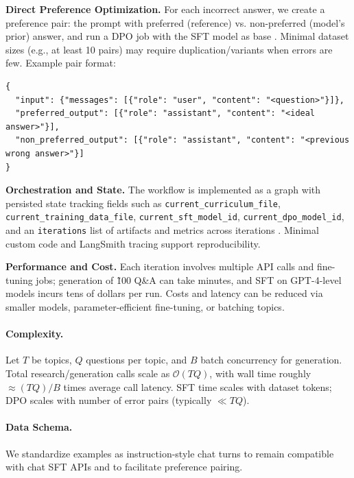 \documentclass[11pt]{article}
\begin{document}
\textbf{Direct Preference Optimization.} For each incorrect answer, we create a preference pair: the prompt with preferred (reference) vs. non-preferred (model’s prior) answer, and run a DPO job with the SFT model as base \citep{rafailov2023dpo}. Minimal dataset sizes (e.g., at least 10 pairs) may require duplication/variants when errors are few. Example pair format:
\begin{verbatim}
{
  "input": {"messages": [{"role": "user", "content": "<question>"}]},
  "preferred_output": [{"role": "assistant", "content": "<ideal answer>"}],
  "non_preferred_output": [{"role": "assistant", "content": "<previous wrong answer>"}]
}
\end{verbatim}

\textbf{Orchestration and State.} The workflow is implemented as a graph with persisted state tracking fields such as \texttt{current\_curriculum\_file}, \texttt{current\_training\_data\_file}, \texttt{current\_sft\_model\_id}, \texttt{current\_dpo\_model\_id}, and an \texttt{iterations} list of artifacts and metrics across iterations \citep{langgraph_docs}. Minimal custom code and LangSmith tracing support reproducibility.

\textbf{Performance and Cost.} Each iteration involves multiple API calls and fine-tuning jobs; generation of \~100 Q\&A can take minutes, and SFT on GPT-4-level models incurs tens of dollars per run. Costs and latency can be reduced via smaller models, parameter-efficient fine-tuning, or batching topics.

\paragraph{Complexity.} Let \(T\) be topics, \(Q\) questions per topic, and \(B\) batch concurrency for generation. Total research/generation calls scale as \(\mathcal{O}(TQ)\), with wall time roughly \(\approx (TQ)/B\) times average call latency. SFT time scales with dataset tokens; DPO scales with number of error pairs (typically \(\ll TQ\)).

\paragraph{Data Schema.} We standardize examples as instruction-style chat turns to remain compatible with chat SFT APIs and to facilitate preference pairing.
\end{document}
